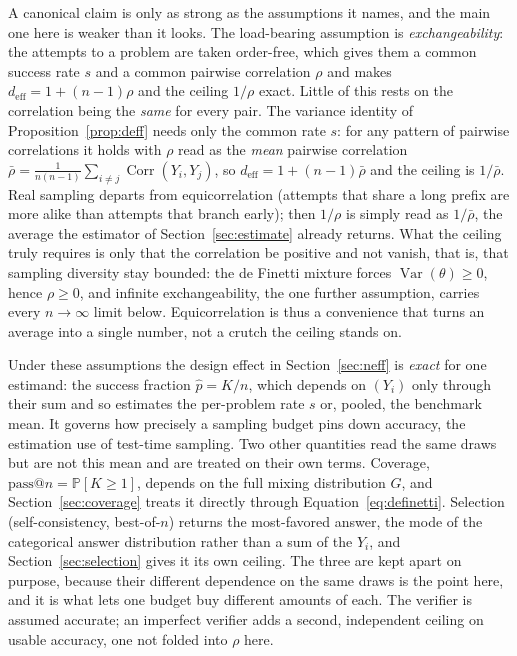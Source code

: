 \documentclass[11pt]{article}
\newcommand{\Prob}{\mathbb{P}}
\newcommand{\Var}{\operatorname{Var}}
\newcommand{\Corr}{\operatorname{Corr}}
\newcommand{\deff}{d_{\mathrm{eff}}}
\begin{document}
A canonical claim is only as strong as the assumptions it names, and the main one here is weaker than it looks. The load-bearing assumption is \emph{exchangeability}: the attempts to a problem are taken order-free, which gives them a common success rate $s$ and a common pairwise correlation $\rho$ and makes $\deff = 1+(n-1)\rho$ and the ceiling $1/\rho$ exact. Little of this rests on the correlation being the \emph{same} for every pair. The variance identity of Proposition~\ref{prop:deff} needs only the common rate $s$: for any pattern of pairwise correlations it holds with $\rho$ read as the \emph{mean} pairwise correlation $\bar\rho = \tfrac{1}{n(n-1)}\sum_{i\ne j}\Corr(Y_i,Y_j)$, so $\deff = 1+(n-1)\bar\rho$ and the ceiling is $1/\bar\rho$. Real sampling departs from equicorrelation (attempts that share a long prefix are more alike than attempts that branch early); then $1/\rho$ is simply read as $1/\bar\rho$, the average the estimator of Section~\ref{sec:estimate} already returns. What the ceiling truly requires is only that the correlation be positive and not vanish, that is, that sampling diversity stay bounded: the de Finetti mixture forces $\Var(\theta)\ge0$, hence $\rho\ge0$, and infinite exchangeability, the one further assumption, carries every $n\to\infty$ limit below. Equicorrelation is thus a convenience that turns an average into a single number, not a crutch the ceiling stands on.

Under these assumptions the design effect in Section~\ref{sec:neff} is \emph{exact} for one estimand: the success fraction $\hat p = K/n$, which depends on $(Y_i)$ only through their sum and so estimates the per-problem rate $s$ or, pooled, the benchmark mean. It governs how precisely a sampling budget pins down accuracy, the estimation use of test-time sampling. Two other quantities read the same draws but are not this mean and are treated on their own terms. Coverage, $\mathrm{pass}@n = \Prob[K\ge1]$, depends on the full mixing distribution $G$, and Section~\ref{sec:coverage} treats it directly through Equation~\eqref{eq:definetti}. Selection (self-consistency, best-of-$n$) returns the most-favored answer, the mode of the categorical answer distribution rather than a sum of the $Y_i$, and Section~\ref{sec:selection} gives it its own ceiling. The three are kept apart on purpose, because their different dependence on the same draws is the point here, and it is what lets one budget buy different amounts of each. The verifier is assumed accurate; an imperfect verifier adds a second, independent ceiling on usable accuracy, one not folded into $\rho$ here.
\end{document}
